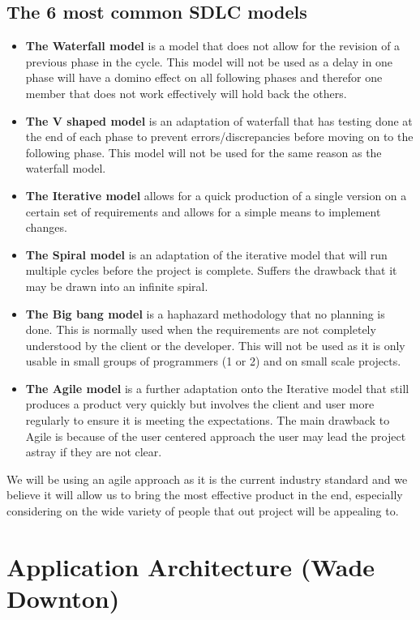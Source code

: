 \documentclass[11pt]{article}
\begin{document}
		\subsection{The 6 most common SDLC models}
			\begin{itemize}
				\item \textbf{The Waterfall model} is a model that does not allow for the revision of a previous phase in the cycle. This model will not be used as a delay in one phase will have a domino effect on all following phases and therefor one member that does not work effectively will hold back the others.
				\item \textbf{The V shaped model} is an adaptation of waterfall that has testing done at the end of each phase to prevent errors/discrepancies before moving on to the following phase. This model will not be used for the same reason as the waterfall model.
				\item \textbf{The Iterative model} allows for a quick production of a single version on a certain set of requirements and allows for a simple means to implement changes.
				\item \textbf{The Spiral model} is an adaptation of the iterative model that will run multiple cycles before the project is complete. Suffers the drawback that it may be drawn into an infinite spiral.
				\item \textbf{The Big bang model} is a haphazard methodology that no planning is done. This is normally used when the requirements are not completely understood by the client or the developer. This will not be used as it is only usable in small groups of programmers (1 or 2) and on small scale projects.
				\item \textbf{The Agile model} is a further adaptation onto the Iterative model that still produces a product very quickly but involves the client and user more regularly to ensure it is meeting the expectations. The main drawback to Agile is because of the user centered approach the user may lead the project astray if they are not clear.
			\end{itemize}
			\begin{flushleft}
				We will be using an agile approach as it is the current industry standard and we believe it will allow us to bring the most effective product in the end, especially considering on the wide variety of people that out project will be appealing to.
			\end{flushleft}
	
	
	\section{Application Architecture (Wade Downton)}
\end{document}
